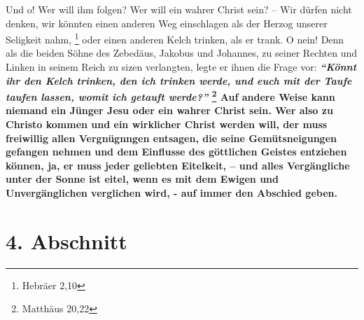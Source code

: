 Und o! Wer will ihm folgen? Wer will ein wahrer Christ sein? -- Wir dürfen nicht
denken, wir könnten einen anderen Weg einschlagen als der Herzog unserer
Seligkeit nahm,
\footnote{Hebräer 2,10}
oder einen anderen Kelch trinken, als er
trank. O nein! Denn als die beiden Söhne des Zebedäus, Jakobus und Johannes, zu
seiner Rechten und Linken in seinem Reich zu sizen verlangten, legte er ihnen
die Frage vor:
\textbf{\textit{"`Könnt ihr den Kelch trinken, den ich trinken werde, und euch
mit der Taufe taufen lassen, womit ich getauft werde?"'} 
\footnote{Matthäus 20,22}
Auf andere Weise kann niemand ein Jünger Jesu oder ein wahrer Christ sein. Wer
also zu Christo kommen und ein wirklicher Christ werden will, der muss freiwillig
allen Vergnügnngen entsagen, die seine Gemütsneigungen gefangen nehmen und dem
Einflusse des göttlichen Geistes entziehen können, ja, er muss jeder geliebten
Eitelkeit, -- und alles Vergängliche unter der Sonne ist eitel, wenn es mit dem
Ewigen und Unvergänglichen verglichen wird, - auf immer den Abschied geben.}

\section{4. Abschnitt} \label{kap16_ab4}

